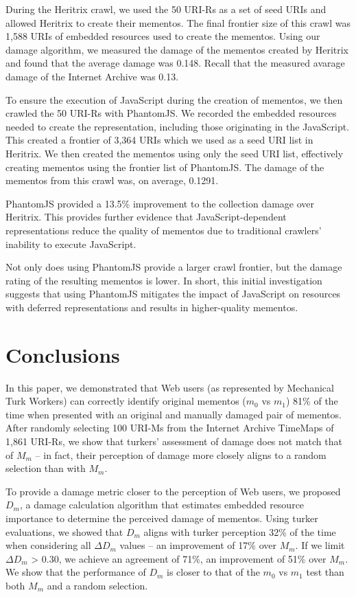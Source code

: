 During the Heritrix crawl, we used the 50 URI-Rs as a set of seed URIs and allowed Heritrix to create their mementos. The final frontier size of this crawl was 1,588 URIs of embedded resources used to create the mementos. Using our damage algorithm, we measured the damage of the mementos created by Heritrix and found that the average damage was 0.148. Recall that the measured avarage damage of the Internet Archive was 0.13.

To ensure the execution of JavaScript during the creation of mementos, we then crawled the 50 URI-Rs with PhantomJS. We recorded the embedded resources needed to create the representation, including those originating in the JavaScript. This created a frontier of 3,364 URIs which we used as a seed URI list in Heritrix. We then created the mementos using only the seed URI list, effectively creating mementos using the frontier list of PhantomJS. The damage of the mementos from this crawl was, on average, 0.1291. 

PhantomJS provided a 13.5\% improvement to the collection damage over Heritrix. This provides further evidence that JavaScript-dependent representations reduce the quality of mementos due to traditional crawlers' inability to execute JavaScript.

Not only does using PhantomJS provide a larger crawl frontier, but the damage rating of the resulting mementos is lower. In short, this initial investigation suggests that using PhantomJS mitigates the impact of JavaScript on resources with deferred representations and results in higher-quality mementos.

\section{Conclusions}
\label{conclusion}
In this paper, we demonstrated that Web users (as represented by Mechanical Turk Workers) can correctly identify original mementos ($m_0$ vs $m_1$) 81\% of the time when presented with an original and manually damaged pair of mementos. After randomly selecting 100 URI-Ms from the Internet Archive TimeMaps of 1,861 URI-Rs, we show that turkers' assessment of damage does not match that of $M_m$ -- in fact, their perception of damage more closely aligns to a random selection than with $M_m$. 

To provide a damage metric closer to the perception of Web users, we proposed $D_m$, a damage calculation algorithm that estimates embedded resource importance to determine the perceived damage of mementos. Using turker evaluations, we showed that $D_m$ aligns with turker perception 32\% of the time when considering all {$\Delta D_m$} values -- an improvement of 17\% over $M_m$. If we limit {$\Delta D_m$} > 0.30, we achieve an agreement of 71\%, an improvement of 51\% over $M_m$. We show that the performance of $D_m$ is closer to that of the $m_0$ vs $m_1$ test than both $M_m$ and a random selection.


